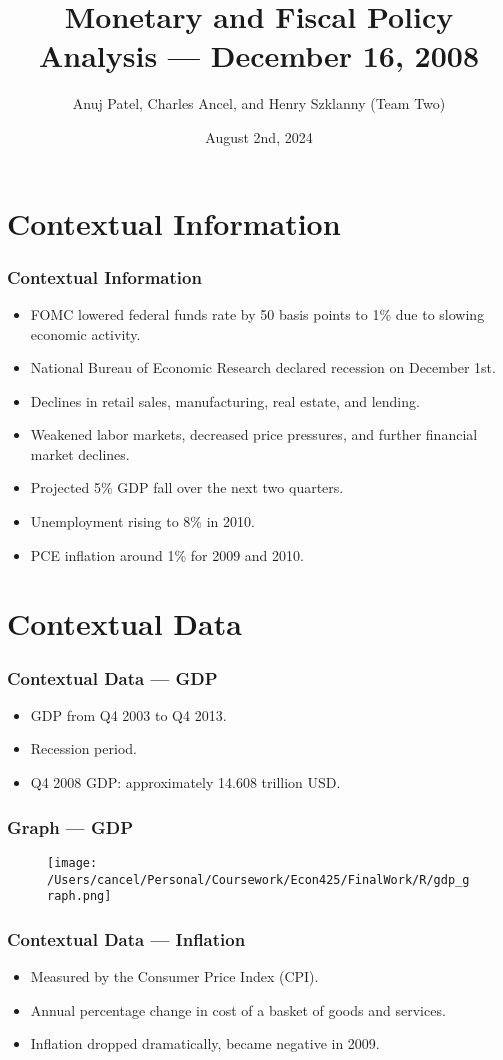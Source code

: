 \documentclass{beamer}
\title{Monetary and Fiscal Policy Analysis --- December 16, 2008}
\author{Anuj Patel, Charles Ancel, and Henry Szklanny (Team Two)}
\date{August 2nd, 2024}
\begin{document}
\frame{\titlepage}

\section{Contextual Information}
\begin{frame}
    \frametitle{Contextual Information}
    \begin{itemize}
        \item FOMC lowered federal funds rate by 50 basis points to 1\% due to slowing economic activity.
        \item National Bureau of Economic Research declared recession on December 1st\@.
        \item Declines in retail sales, manufacturing, real estate, and lending.
        \item Weakened labor markets, decreased price pressures, and further financial market declines.
        \item Projected 5\% GDP fall over the next two quarters.
        \item Unemployment rising to 8\% in 2010.
        \item PCE inflation around 1\% for 2009 and 2010.
    \end{itemize}
\end{frame}

\section{Contextual Data}
\begin{frame}
    \frametitle{Contextual Data --- GDP}
    \begin{itemize}
        \item GDP from Q4 2003 to Q4 2013.
        \item Recession period.
        \item Q4 2008 GDP\@: approximately 14.608 trillion USD\@.
    \end{itemize}
\end{frame}

\begin{frame}
    \frametitle{Graph --- GDP}
    \begin{figure}[h!]
        \centering
        \texttt{[image: /Users/cancel/Personal/Coursework/Econ425/FinalWork/R/gdp\_graph.png]}
    \end{figure}
\end{frame}

\begin{frame}
    \frametitle{Contextual Data --- Inflation}
    \begin{itemize}
        \item Measured by the Consumer Price Index (CPI).
        \item Annual percentage change in cost of a basket of goods and services.
        \item Inflation dropped dramatically, became negative in 2009.
    \end{itemize}
\end{frame}
\end{document}
